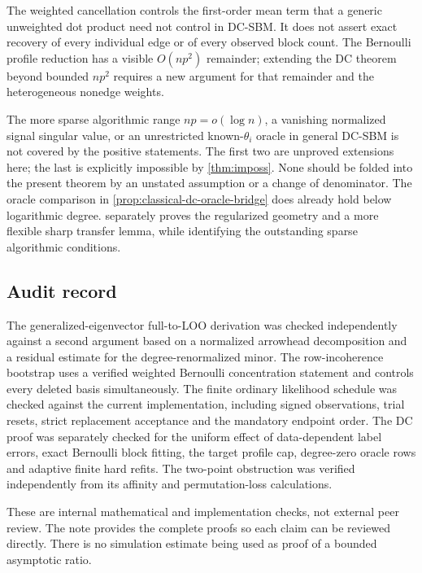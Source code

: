 The weighted cancellation controls the first-order mean term that a
generic unweighted dot product need not control in DC-SBM. It does not
assert exact recovery of every individual edge or of every observed
block count. The Bernoulli profile reduction has a visible $O(np^2)$
remainder; extending the DC theorem beyond bounded $np^2$ requires a new
argument for that remainder and the heterogeneous nonedge weights.

The more sparse algorithmic range $np=o(\log n)$, a vanishing normalized signal
singular value, or an unrestricted known-$\theta_i$ oracle in general
DC-SBM is not covered by the positive statements. The first two are
unproved extensions here; the last is explicitly impossible by
\cref{thm:imposs}. None should be folded into the present theorem by an
unstated assumption or a change of denominator.
The oracle comparison in \cref{prop:classical-dc-oracle-bridge} does
already hold below logarithmic degree. 
separately proves the regularized geometry and a more flexible sharp
transfer lemma, while identifying the outstanding sparse algorithmic
conditions.

\subsection{Audit record}

The generalized-eigenvector full-to-LOO derivation was checked independently
against a second argument based on a normalized arrowhead decomposition
and a residual estimate for the degree-renormalized minor.
The row-incoherence bootstrap uses a verified weighted Bernoulli
concentration statement and controls every deleted basis simultaneously.
The finite ordinary likelihood schedule was checked against the current
implementation, including signed observations, trial resets, strict
replacement acceptance and the mandatory endpoint order.
The DC proof was separately checked for the uniform effect of
data-dependent label errors, exact Bernoulli block fitting, the target
profile cap, degree-zero oracle rows and adaptive finite hard refits.
The two-point obstruction was verified independently from its affinity
and permutation-loss calculations.

These are internal mathematical and implementation checks, not external
peer review. The note provides the complete proofs so each claim can be
reviewed directly. There is no simulation estimate being used as proof
of a bounded asymptotic ratio.
